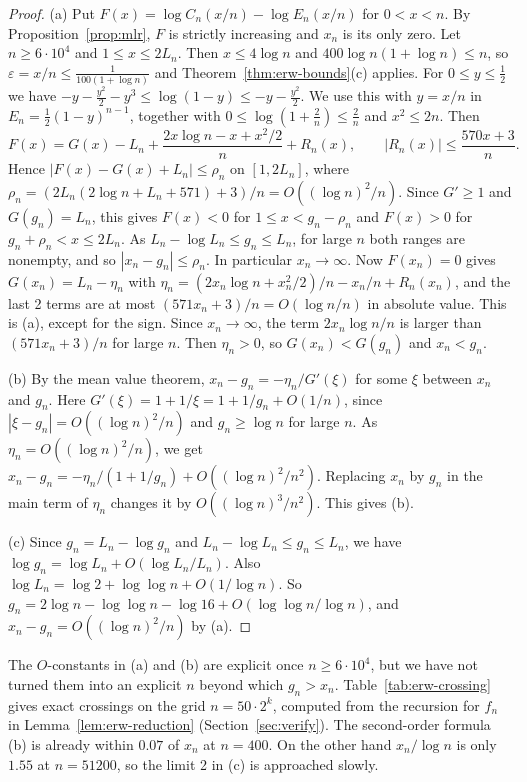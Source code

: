 \begin{proof}
(a) Put $F(x)=\log C_n(x/n)-\log E_n(x/n)$ for $0<x<n$. By
Proposition~\ref{prop:mlr}, $F$ is strictly increasing and $x_n$ is its
only zero. Let $n\ge6\cdot10^4$ and $1\le x\le2L_n$. Then $x\le4\log n$
and $400\log n(1+\log n)\le n$, so $\varepsilon=x/n\le\frac1{100(1+\log n)}$
and Theorem~\ref{thm:erw-bounds}(c) applies. For $0\le y\le\frac12$ we have
$-y-\frac{y^2}2-y^3\le\log(1-y)\le-y-\frac{y^2}2$. We use this with
$y=x/n$ in $E_n=\frac12(1-y)^{n-1}$, together with
$0\le\log(1+\frac2n)\le\frac2n$ and $x^2\le2n$. Then
\[
 F(x)=G(x)-L_n+\frac{2x\log n-x+x^2/2}{n}+R_n(x),\qquad
 |R_n(x)|\le\frac{570x+3}{n}.
\]
Hence $|F(x)-G(x)+L_n|\le\rho_n$ on $[1,2L_n]$, where
$\rho_n=(2L_n(2\log n+L_n+571)+3)/n=O((\log n)^2/n)$. Since $G'\ge1$ and
$G(g_n)=L_n$, this gives $F(x)<0$ for $1\le x<g_n-\rho_n$ and $F(x)>0$ for
$g_n+\rho_n<x\le2L_n$. As $L_n-\log L_n\le g_n\le L_n$, for large $n$ both
ranges are nonempty, and so $|x_n-g_n|\le\rho_n$. In particular
$x_n\to\infty$. Now $F(x_n)=0$ gives $G(x_n)=L_n-\eta_n$ with
$\eta_n=(2x_n\log n+x_n^2/2)/n-x_n/n+R_n(x_n)$, and the last 2 terms are at
most $(571x_n+3)/n=O(\log n/n)$ in absolute value. This is (a), except for
the sign. Since $x_n\to\infty$, the term $2x_n\log n/n$ is larger than
$(571x_n+3)/n$ for large $n$. Then $\eta_n>0$, so $G(x_n)<G(g_n)$ and
$x_n<g_n$.

(b) By the mean value theorem, $x_n-g_n=-\eta_n/G'(\xi)$ for some $\xi$
between $x_n$ and $g_n$. Here $G'(\xi)=1+1/\xi=1+1/g_n+O(1/n)$, since
$|\xi-g_n|=O((\log n)^2/n)$ and $g_n\ge\log n$ for large $n$. As
$\eta_n=O((\log n)^2/n)$, we get
$x_n-g_n=-\eta_n/(1+1/g_n)+O((\log n)^2/n^2)$. Replacing $x_n$ by $g_n$ in
the main term of $\eta_n$ changes it by $O((\log n)^3/n^2)$. This gives
(b).

(c) Since $g_n=L_n-\log g_n$ and $L_n-\log L_n\le g_n\le L_n$, we have
$\log g_n=\log L_n+O(\log L_n/L_n)$. Also
$\log L_n=\log2+\log\log n+O(1/\log n)$. So
$g_n=2\log n-\log\log n-\log16+O(\log\log n/\log n)$, and
$x_n-g_n=O((\log n)^2/n)$ by (a).
\end{proof}

The $O$-constants in (a) and (b) are explicit once $n\ge6\cdot10^4$, but we
have not turned them into an explicit $n$ beyond which $g_n>x_n$.
Table~\ref{tab:erw-crossing} gives exact crossings on the grid
$n=50\cdot2^k$, computed from the recursion for $f_n$ in
Lemma~\ref{lem:erw-reduction} (Section~\ref{sec:verify}). The second-order
formula (b) is already within $0.07$ of $x_n$ at $n=400$. On the other hand
$x_n/\log n$ is only $1.55$ at $n=51200$, so the limit 2 in (c) is
approached slowly.

